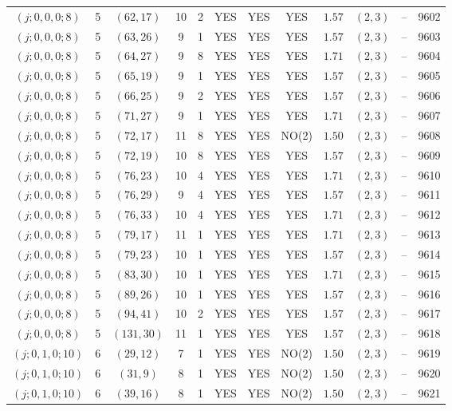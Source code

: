 \begin{longtable}{|c|c|c|c|c|c|c|c|c|c|c|c|}
$(j;0,0,0;8)$ & 5 & $(62,17)$ & 10 & 2 & YES & YES & YES & $1.57$ & $(2,3)$ & -- & 9602\\
$(j;0,0,0;8)$ & 5 & $(63,26)$ & 9 & 1 & YES & YES & YES & $1.57$ & $(2,3)$ & -- & 9603\\
$(j;0,0,0;8)$ & 5 & $(64,27)$ & 9 & 8 & YES & YES & YES & $1.71$ & $(2,3)$ & -- & 9604\\
$(j;0,0,0;8)$ & 5 & $(65,19)$ & 9 & 1 & YES & YES & YES & $1.57$ & $(2,3)$ & -- & 9605\\
$(j;0,0,0;8)$ & 5 & $(66,25)$ & 9 & 2 & YES & YES & YES & $1.57$ & $(2,3)$ & -- & 9606\\
$(j;0,0,0;8)$ & 5 & $(71,27)$ & 9 & 1 & YES & YES & YES & $1.71$ & $(2,3)$ & -- & 9607\\
$(j;0,0,0;8)$ & 5 & $(72,17)$ & 11 & 8 & YES & YES & NO(2) & $1.50$ & $(2,3)$ & -- & 9608\\
$(j;0,0,0;8)$ & 5 & $(72,19)$ & 10 & 8 & YES & YES & YES & $1.57$ & $(2,3)$ & -- & 9609\\
$(j;0,0,0;8)$ & 5 & $(76,23)$ & 10 & 4 & YES & YES & YES & $1.71$ & $(2,3)$ & -- & 9610\\
$(j;0,0,0;8)$ & 5 & $(76,29)$ & 9 & 4 & YES & YES & YES & $1.57$ & $(2,3)$ & -- & 9611\\
$(j;0,0,0;8)$ & 5 & $(76,33)$ & 10 & 4 & YES & YES & YES & $1.71$ & $(2,3)$ & -- & 9612\\
$(j;0,0,0;8)$ & 5 & $(79,17)$ & 11 & 1 & YES & YES & YES & $1.71$ & $(2,3)$ & -- & 9613\\
$(j;0,0,0;8)$ & 5 & $(79,23)$ & 10 & 1 & YES & YES & YES & $1.57$ & $(2,3)$ & -- & 9614\\
$(j;0,0,0;8)$ & 5 & $(83,30)$ & 10 & 1 & YES & YES & YES & $1.71$ & $(2,3)$ & -- & 9615\\
$(j;0,0,0;8)$ & 5 & $(89,26)$ & 10 & 1 & YES & YES & YES & $1.57$ & $(2,3)$ & -- & 9616\\
$(j;0,0,0;8)$ & 5 & $(94,41)$ & 10 & 2 & YES & YES & YES & $1.57$ & $(2,3)$ & -- & 9617\\
$(j;0,0,0;8)$ & 5 & $(131,30)$ & 11 & 1 & YES & YES & YES & $1.57$ & $(2,3)$ & -- & 9618\\
$(j;0,1,0;10)$ & 6 & $(29,12)$ & 7 & 1 & YES & YES & NO(2) & $1.50$ & $(2,3)$ & -- & 9619\\
$(j;0,1,0;10)$ & 6 & $(31,9)$ & 8 & 1 & YES & YES & NO(2) & $1.50$ & $(2,3)$ & -- & 9620\\
$(j;0,1,0;10)$ & 6 & $(39,16)$ & 8 & 1 & YES & YES & NO(2) & $1.50$ & $(2,3)$ & -- & 9621\\

\end{longtable}

